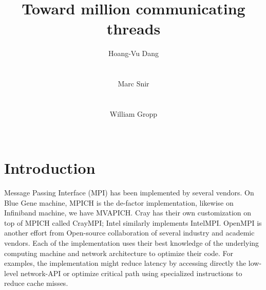 \documentclass{sig-alternate-05-2015}
\begin{document}




\title{Toward million communicating threads}

\author{
\alignauthor
Hoang-Vu Dang\\
\\
\\
%
\alignauthor
Marc Snir\\
\\
\\
%
\alignauthor
William Gropp
\\
\\
}

\maketitle


\section{Introduction}
Message Passing Interface (MPI) has been implemented by several vendors. On
Blue Gene machine, MPICH is the de-factor implementation, likewise on
Infiniband machine, we have MVAPICH. Cray has their own customization on top of
MPICH called CrayMPI; Intel similarly implements IntelMPI. OpenMPI is another
effort from Open-source collaboration of several industry and academic vendors.
Each of the implementation uses their best knowledge of the underlying
computing machine and network architecture to optimize their code. For
examples, the implementation might reduce latency by accessing directly the
low-level network-API or optimize critical path using specialized instructions
to reduce cache misses.
\end{document}
